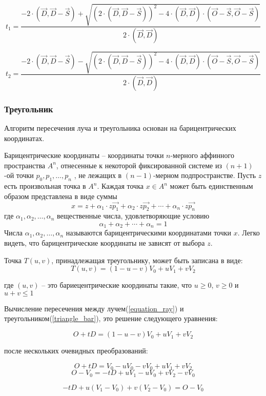 $$
t_{1} = \frac{ - 2 \cdot (\vec{D}, \vec{D} - \vec{S}) + \sqrt{(2 \cdot (\vec{D}, \vec{D} - \vec{S}))^2 - 4 \cdot (\vec{D}, \vec{D}) \cdot (\vec{O} - \vec{S}, \vec{O} - \vec{S} )}}{2 \cdot (\vec{D}, \vec{D})}
$$

$$
t_{2} = \frac{ - 2 \cdot (\vec{D}, \vec{D} - \vec{S}) - \sqrt{(2 \cdot (\vec{D}, \vec{D} - \vec{S}))^2 - 4 \cdot (\vec{D}, \vec{D}) \cdot (\vec{O} - \vec{S}, \vec{O} - \vec{S} )}}{2 \cdot (\vec{D}, \vec{D})}
$$

\subsubsection{Треугольник}
Алгоритм пересечения луча и треугольника основан на барицентрических координатах.
\par
Барицентрические координаты -- координаты точки $n$-мерного аффинного пространства $A^n$, отнесенные к некоторой фиксированной системе из $(n + 1)$-ой точки $p_0, p_1, \dots, p_n$ , не лежащих в $(n -1)$-мерном подпространстве. Пусть $z$ есть произвольная точка в $A^n$. Каждая точка $x \in A^n$ может быть единственным образом представлена в виде суммы
$$
	x = z + \alpha_1 \cdot z\vec{p_1} + \alpha_2 \cdot z\vec{p_2} + \cdots + \alpha_n \cdot z\vec{p_n} 
$$
где $\alpha_1, \alpha_2, \dots,  \alpha_n $ вещественные числа, удовлетворяющие условию
$$
\alpha_1 + \alpha_2 + \cdots + \alpha_n  = 1
$$
Числа $\alpha_1, \alpha_2, \dots,  \alpha_n $ называются барицентрическими координатами точки $x$. Легко видеть, что барицентрические координаты не зависят от выбора $z$.

Точка $T(u,v)$, принадлежащая треугольнику, может быть записана в виде:
\begin{equation}
\label{triangle_bar}
T(u,v) = (1-u-v)V_0 + uV_1 + vV_2
\end{equation}

\noindent где $(u,v)$ -- это бариецентрические координаты такие, что $u \geq 0$, $v \geq 0$ и $u + v \leq 1$

Вычисление пересечения между лучем(\ref{equation_ray}) и треугольником(\ref{triangle_bar}), это решение следующего уравнения:

$$
O + tD = (1-u-v)V_0 + uV_1 + vV_2
$$

\noindent после нескольких очевидных преобразований:

$$
O + tD = V_0 - uV_0 - vV_0 + uV_1 + vV_2
$$
$$
O - V_0 = - tD + uV_1 - uV_0 + vV_2 - vV_0
$$

$$
- tD + u(V_1 - V_0) + v(V_2 - V_0) = O - V_0
$$


